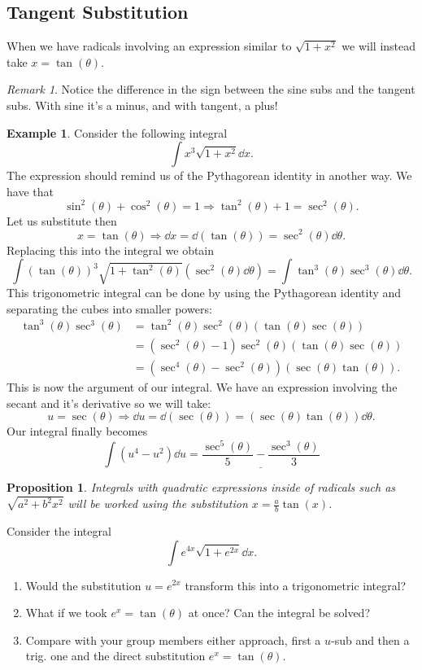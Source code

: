 \documentclass[12pt]{article}
\theoremstyle{plain}
\newtheorem{Prop}[Th]{Proposition}     %
\theoremstyle{definition}
\newtheorem{Ex}[Th]{Example}           %
\theoremstyle{remark}
\newtheorem*{Rmk}{Remark}      %
\newcommand{\te}{\theta}                %
\renewcommand{\:}{\colon}           %
\newcommand{\un}[1]{\underline{#1}}
\renewcommand{\.}{\Cdot}                %
\newcommand{\To}{\Rightarrow}
\begin{document}
\begin{multicols}{2}
\subsection*{Tangent Substitution}

When we have radicals involving an expression similar to $\sqrt{1+x^2}$ we will instead take $x=\tan(\te)$.
\begin{Rmk}
Notice the difference in the sign between the sine subs and the tangent subs. With sine it's a minus, and with tangent, a plus!
\end{Rmk}
\begin{Ex}
  Consider the following integral
  $$\int x^3\sqrt{1+x^2}\dd x.$$
  The expression should remind us of the Pythagorean identity in another way. We have that 
  $$\sin^2(\te)+\cos^2(\te)=1\To \tan^2(\te)+1=\sec^2(\te).$$
  Let us substitute then 
  $$x=\tan(\te)\To\dd x=\dd(\tan(\te))=\sec^2(\te)\dd\te.$$
  Replacing this into the integral we obtain
  $$\int(\tan(\te))^3\sqrt{1+\tan^2(\te)}(\sec^2(\te)\dd\te)=\int\tan^3(\te)\sec^3(\te)\dd\te.$$
  This trigonometric integral can be done by using the Pythagorean identity and separating the cubes into smaller powers:
  \begin{align*}
    \tan^3(\te)\sec^3(\te)&=\tan^2(\te)\sec^2(\te)(\tan(\te)\sec(\te))\\
    &=(\sec^2(\te)-1)\sec^2(\te)(\tan(\te)\sec(\te))\\
    &=(\sec^4(\te)-\sec^2(\te))(\sec(\te)\tan(\te)).
  \end{align*}
  This is now the argument of our integral. We have an expression involving the secant and it's derivative so we will take:
  $$u=\sec(\te)\To\dd u=\dd(\sec(\te))=(\sec(\te)\tan(\te))\dd\te.$$
  Our integral finally becomes 
  $$\int(u^4-u^2)\dd u=\un{\frac{\sec^5(\te)}{5}-\frac{\sec^3(\te)}{3}}$$
\end{Ex}

\begin{Prop}
  Integrals with quadratic expressions inside of radicals such as \un{$\sqrt{a^2+b^2x^2}$} will be worked using the substitution \un{$x=\frac{a}{b}\tan(x)$}.
\end{Prop}

\begin{ptcbP}
  Consider the integral 
  $$\int e^{4x}\sqrt{1+e^{2x}}\dd x.$$
  \begin{enumerate}
   \itemsep=-0.4em
   \item Would the substitution $u=e^{2x}$ transform this into a trigonometric integral?
   \item What if we took $e^x=\tan(\te)$ at once? Can the integral be solved?
   \item Compare with your group members either approach, first a $u$-sub and then a trig. one and the direct substitution $e^x=\tan(\te)$.
  \end{enumerate}
\end{ptcbP}


\end{multicols}
\end{document}
